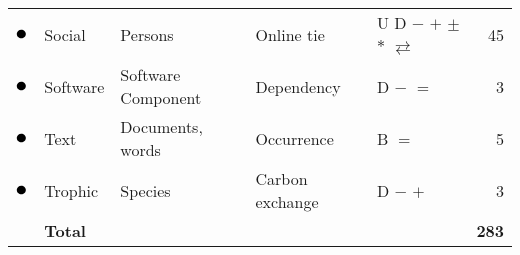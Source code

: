 \begin{tabular}{lllllr}
\textcolor{colorSocial}{$\newmoon$} &Social & Persons & Online tie & U D \phantom{B} $-$ \phantom{$=$} $+$ $\pm$ \phantom{$\stackrel{+}{=}$} $*$ \phantom{$_*{}^*$} $\rightleftarrows$ \phantom{$++$}  &  45\\
\textcolor{colorSoftware}{$\newmoon$} &Software & Software Component & Dependency & \phantom{U} D \phantom{B} $-$ $=$ \phantom{$+$} \phantom{$\pm$} \phantom{$\stackrel{+}{=}$} \phantom{$*$} \phantom{$_*{}^*$} \phantom{$\rightleftarrows$} \phantom{$++$}  &  3\\
\textcolor{colorText}{$\newmoon$} &Text & Documents, words & Occurrence & \phantom{U} \phantom{D} B \phantom{$-$} $=$ \phantom{$+$} \phantom{$\pm$} \phantom{$\stackrel{+}{=}$} \phantom{$*$} \phantom{$_*{}^*$} \phantom{$\rightleftarrows$} \phantom{$++$}  &  5\\
\textcolor{colorTrophic}{$\newmoon$} &Trophic & Species & Carbon exchange & \phantom{U} D \phantom{B} $-$ \phantom{$=$} $+$ \phantom{$\pm$} \phantom{$\stackrel{+}{=}$} \phantom{$*$} \phantom{$_*{}^*$} \phantom{$\rightleftarrows$} \phantom{$++$}  &  3\\
\midrule
& \textbf{Total} &&&& \textbf{283}\\
\bottomrule
\end{tabular}
